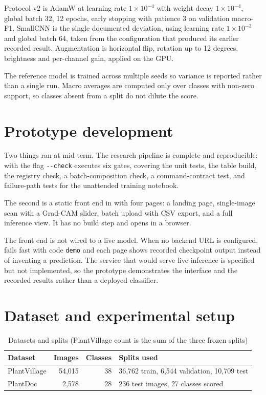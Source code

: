 Protocol v2 is AdamW at learning rate $1\times10^{-4}$ with weight decay
$1\times10^{-4}$, global batch 32, 12 epochs, early stopping with patience 3 on
validation macro-F1. SmallCNN is the single documented deviation, using learning rate
$1\times10^{-3}$ and global batch 64, taken from the configuration that produced its
earlier recorded result. Augmentation is horizontal flip, rotation up to 12 degrees,
brightness and per-channel gain, applied on the GPU.

The reference model is trained across multiple seeds so variance is reported rather
than a single run. Macro averages are computed only over classes with non-zero
support, so classes absent from a split do not dilute the score.

\section{Prototype development}

Two things ran at mid-term. The research pipeline is complete and reproducible:
 with the flag \texttt{-{}-check} executes six gates, covering the unit tests, the
table build, the registry check, a batch-composition check, a command-contract test,
and failure-path tests for the unattended training notebook.

The second is a static front end in  with four pages: a landing
page, single-image scan with a Grad-CAM slider, batch upload with CSV export, and a
full inference view. It has no build step and opens in a browser.

The front end is not wired to a live model. When no backend URL is configured,
 fails fast with code \texttt{demo} and each page shows
recorded checkpoint output instead of inventing a prediction. The service that would
serve live inference is specified but not implemented, so the prototype demonstrates
the interface and the recorded results rather than a deployed classifier.

\section{Dataset and experimental setup}

\begin{table}[H]
\centering
\caption{Datasets and splits (PlantVillage count is the sum of the three frozen splits)}
\label{tab:data-mid}
\tabfont
\begin{tabularx}{\textwidth}{@{}lrrY@{}}
\toprule
\textbf{Dataset} & \textbf{Images} & \textbf{Classes} & \textbf{Splits used} \\
\midrule
PlantVillage & 54,015 & 38 & 36,762 train, 6,544 validation, 10,709 test \\
PlantDoc & 2,578 & 28 & 236 test images, 27 classes scored \\
\bottomrule
\end{tabularx}
\end{table}

